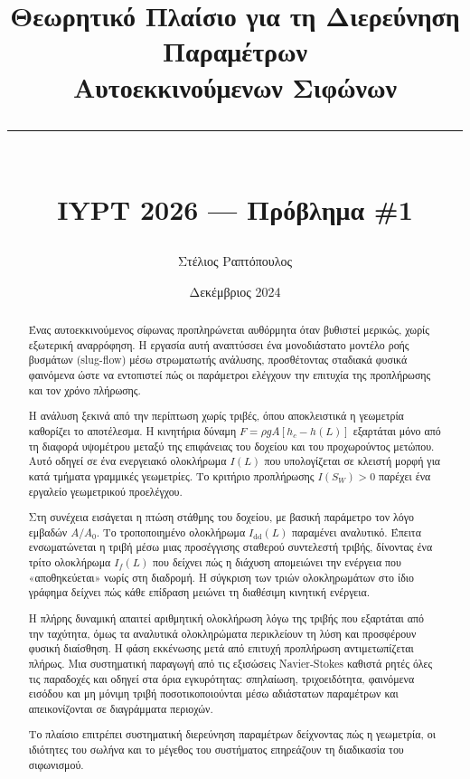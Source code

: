 \documentclass[11pt]{article}
\title{Θεωρητικό Πλαίσιο για τη Διερεύνηση Παραμέτρων\\
       Αυτοεκκινούμενων Σιφώνων\\[0.75em]
       \rule{0.7\textwidth}{0.4pt}\\[0.75em]
       \large IYPT 2026 --- Πρόβλημα \#1}
\author{Στέλιος Ραπτόπουλος}
\date{Δεκέμβριος 2024}
\begin{document}
\maketitle

\begin{abstract}
Ένας αυτοεκκινούμενος σίφωνας προπληρώνεται αυθόρμητα όταν βυθιστεί μερικώς, χωρίς εξωτερική αναρρόφηση. Η εργασία αυτή αναπτύσσει ένα μονοδιάστατο μοντέλο ροής βυσμάτων (slug-flow) μέσω στρωματωτής ανάλυσης, προσθέτοντας σταδιακά φυσικά φαινόμενα ώστε να εντοπιστεί πώς οι παράμετροι ελέγχουν την επιτυχία της προπλήρωσης και τον χρόνο πλήρωσης.

Η ανάλυση ξεκινά από την περίπτωση χωρίς τριβές, όπου αποκλειστικά η γεωμετρία καθορίζει το αποτέλεσμα. Η κινητήρια δύναμη $F = \rho g A [h_c - h(L)]$ εξαρτάται μόνο από τη διαφορά υψομέτρου μεταξύ της επιφάνειας του δοχείου και του προχωρούντος μετώπου. Αυτό οδηγεί σε ένα ενεργειακό ολοκλήρωμα $I(L)$ που υπολογίζεται σε κλειστή μορφή για κατά τμήματα γραμμικές γεωμετρίες. Το κριτήριο προπλήρωσης $I(S_W) > 0$ παρέχει ένα εργαλείο γεωμετρικού προελέγχου.

Στη συνέχεια εισάγεται η πτώση στάθμης του δοχείου, με βασική παράμετρο τον λόγο εμβαδών $A/A_0$. Το τροποποιημένο ολοκλήρωμα $I_{\text{dd}}(L)$ παραμένει αναλυτικό. Έπειτα ενσωματώνεται η τριβή μέσω μιας προσέγγισης σταθερού συντελεστή τριβής, δίνοντας ένα τρίτο ολοκλήρωμα $I_f(L)$ που δείχνει πώς η διάχυση απομειώνει την ενέργεια που «αποθηκεύεται» νωρίς στη διαδρομή. Η σύγκριση των τριών ολοκληρωμάτων στο ίδιο γράφημα δείχνει πώς κάθε επίδραση μειώνει τη διαθέσιμη κινητική ενέργεια.

Η πλήρης δυναμική απαιτεί αριθμητική ολοκλήρωση λόγω της τριβής που εξαρτάται από την ταχύτητα, όμως τα αναλυτικά ολοκληρώματα περικλείουν τη λύση και προσφέρουν φυσική διαίσθηση. Η φάση εκκένωσης μετά από επιτυχή προπλήρωση αντιμετωπίζεται πλήρως. Μια συστηματική παραγωγή από τις εξισώσεις Navier-Stokes καθιστά ρητές όλες τις παραδοχές και οδηγεί στα όρια εγκυρότητας: σπηλαίωση, τριχοειδότητα, φαινόμενα εισόδου και μη μόνιμη τριβή ποσοτικοποιούνται μέσω αδιάστατων παραμέτρων και απεικονίζονται σε διαγράμματα περιοχών.

Το πλαίσιο επιτρέπει συστηματική διερεύνηση παραμέτρων δείχνοντας πώς η γεωμετρία, οι ιδιότητες του σωλήνα και το μέγεθος του συστήματος επηρεάζουν τη διαδικασία του σιφωνισμού.
\end{abstract}
\end{document}
